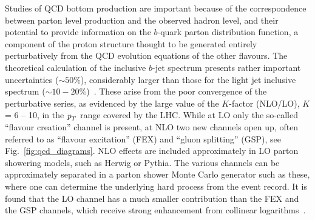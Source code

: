 Studies of QCD bottom production are important because of the correspondence between parton level production and the observed hadron level, and their potential to provide information on the $b$-quark parton distribution function, a component of the proton structure thought to be generated entirely perturbatively from the QCD evolution equations of the other flavours. The theoretical calculation of the inclusive $b$-jet spectrum presents rather important uncertainties ($\sim 50\%$), considerably larger than those for the light jet inclusive spectrum ($\sim 10-20\%$)~\cite{Frixione:1996nh}. These arise from the poor convergence of the perturbative series, as evidenced by the large value of the $K$-factor (NLO/LO), $K$ = 6 -- 10, in the ${\emph{p}_{T}}$ range covered by the LHC. While at LO only the so-called ``flavour creation'' channel is present, at NLO two new channels open up, often referred to as ``flavour excitation'' (FEX) and ``gluon splitting'' (GSP), see Fig.~\ref{fig:qcd_diagrams}. NLO effects are included approximately in LO parton showering models, such as {\sc Herwig}
or {\sc Pythia}.
The various channels can be approximately separated in a parton shower Monte Carlo generator such as these, where one can determine the underlying hard process from the event record. It is found that the LO channel has a much smaller contribution than 
the FEX and the GSP channels, which
receive strong enhancement from collinear logarithms~\cite{GSP}. 


